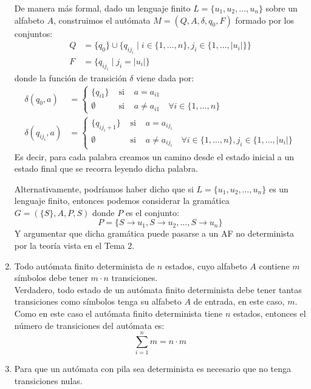 \begin{enumerate}
        De manera más formal, dado un lenguaje finito $L=\{u_1,u_2, \ldots, u_n\}$ sobre un alfabeto $A$, construimos el autómata $M=(Q,A,\delta, q_0, F)$ formado por los conjuntos:
        \begin{align*}
            Q &= \{q_0\} \cup \{q_{ij_i} \mid i \in \{1,\ldots,n\}, j_i \in \{1,\ldots, |u_i|\}\} \\
            F &= \{q_{ij_i} \mid j_i = |u_i|\}
        \end{align*}
        donde la función de transición $\delta$ viene dada por:
        \begin{align*}
            \delta(q_0, a) &= \left\{\begin{array}{ccl}
                    \{q_{i1}\} & \text{\ si\ } & a = a_{i1} \\
                    \emptyset & \text{\ si\ } & a\neq a_{i1} \quad \forall i \in \{1,\ldots,n\}
            \end{array}\right. \\
            \delta(q_{ij_i}, a) &= \left\{\begin{array}{ccl}
                    \{q_{ij_i+1}\} & \text{\ si\ } & a = a_{ij_i} \\
                    \emptyset & \text{\ si\ } & a \neq a_{ij_i} \quad \forall i \in \{1,\ldots,n\}, j_i\in \{1,\ldots,|u_i|\}
            \end{array}\right.
        \end{align*}
        Es decir, para cada palabra creamos un camino desde el estado inicial a un estado final que se recorra leyendo dicha palabra.

        Alternativamente, podríamos haber dicho que si $L=\{u_1,u_2,\ldots, u_n\}$ es un lenguaje finito, entonces podemos considerar la gramática $G=(\{S\}, A, P, S)$ donde $P$ es el conjunto:
        \begin{equation*}
            P = \{S\rightarrow u_1,  S\rightarrow u_2,  \ldots,  S\rightarrow u_n\}
        \end{equation*}
        Y argumentar que dicha gramática puede pasarse a un AF no determinista por la teoría vista en el Tema 2.
    \item Todo autómata finito determinista de $n$ estados, cuyo alfabeto $A$ contiene $m$ símbolos debe tener $m\cdot n$ transiciones.\\

        Verdadero, todo estado de un autómata finito determinista debe tener tantas transiciones como símbolos tenga su alfabeto $A$ de entrada, en este caso, $m$. Como en este caso el autómata finito determinista tiene $n$ estados, entonces el número de transiciones del autómata es:
        \begin{equation*}
            \sum_{i=1}^{n} m = n\cdot m
        \end{equation*}
    \item Para que un autómata con pila sea determinista es necesario que no tenga transiciones nulas.\\


\end{enumerate}
